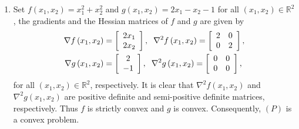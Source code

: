 \documentclass[a4paper]{article}
\numberwithin{equation}{section}
\begin{document}
\begin{enumerate}
\item Set $f\left( {{x_1},{x_2}} \right) = x_1^2 + x_2^2$ and $g\left( {{x_1},{x_2}} \right) = 2{x_1} - {x_2} - 1$ for all $\left(x_1,x_2\right)\in \mathbb{R}^2$, the gradients and the Hessian matrices of $f$ and $g$ are given by
\begin{align}
\nabla f\left( {{x_1},{x_2}} \right) &= \left[ {\begin{array}{*{20}{c}}
{2{x_1}}\\
{2{x_2}}
\end{array}} \right],\hspace{0.2cm} {\nabla ^2}f\left( {{x_1},{x_2}} \right) = \left[ {\begin{array}{*{20}{c}}
2&0\\
0&2
\end{array}} \right],\\
\nabla g\left( {{x_1},{x_2}} \right) &= \left[ {\begin{array}{*{20}{c}}
2\\
{ - 1}
\end{array}} \right],\hspace{0.2cm} {\nabla ^2}g\left( {{x_1},{x_2}} \right) = \left[ {\begin{array}{*{20}{c}}
0&0\\
0&0
\end{array}} \right],
\end{align}
for all $\left(x_1,x_2\right)\in \mathbb{R}^2$, respectively. It is clear that ${\nabla ^2}f\left( {{x_1},{x_2}} \right)$ and ${\nabla ^2}g\left( {{x_1},{x_2}} \right)$ are positive definite and semi-positive definite matrices, respectively. Thus $f$ is strictly convex and $g$ is convex. Consequently, $\left(P\right)$ is a convex problem. 


\end{enumerate}
\end{document}
